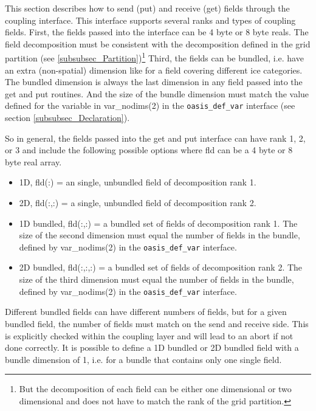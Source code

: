 This section describes how to send (put) and receive (get) fields through
the coupling interface.  This interface supports several ranks and
types of coupling fields.  First, the fields passed into the interface can be 
4 byte or 8 byte reals. The field decomposition must be 
consistent with the decomposition defined in the grid partition (see \ref{subsubsec_Partition})\footnote{But the decomposition of each field can be either one
dimensional or two dimensional and does not
have to match the rank of the grid partition.}  Third, the fields
can be bundled, i.e. have an extra (non-spatial) dimension like for a field covering different ice categories.  The bundled dimension is always the last dimension in any
field passed into the get and put routines.  And the size of the bundle dimension
must match the value defined for the variable in var\_nodims(2) in the
{\tt oasis\_def\_var} interface (see section \ref{subsubsec_Declaration}).

So in general, the fields passed into the get and put interface can have rank
1, 2, or 3 and include the following possible options where fld can be a 4
byte or 8 byte real array.

\begin{itemize}
\item 1D, fld(:) = an single, unbundled field of decomposition rank 1.
\item 2D, fld(:,:) = a single, unbundled field of decomposition rank 2.
\item 1D bundled, fld(:,:) = a bundled set of fields of decomposition rank 1.
  The size of the second dimension must equal the number of fields in the 
  bundle, defined by var\_nodims(2) in the {\tt oasis\_def\_var} interface.
\item 2D bundled, fld(:,:,:) = a bundled set of fields of decomposition rank 2.
  The size of the third dimension must equal the number of fields in the 
  bundle, defined by var\_nodims(2) in the {\tt oasis\_def\_var} interface.
\end{itemize}

Different bundled fields
can have different numbers of fields, but for a given bundled field, the
number of fields must match on the send and receive side.  This is explicitly
checked within the coupling layer and will lead to an abort if not done correctly.
It is possible to define a 1D bundled or 2D bundled field  with a bundle dimension of 1, i.e. for a bundle that contains only one single field.

